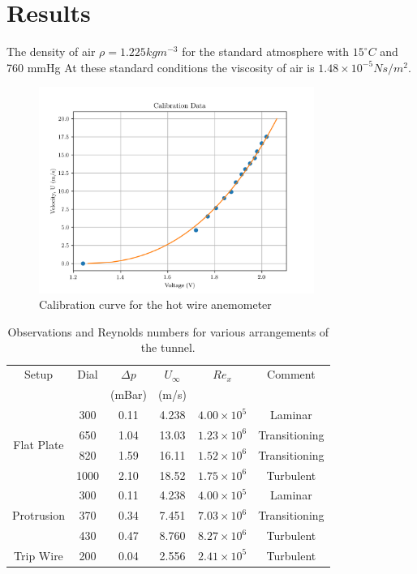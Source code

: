 \documentclass{article}
\begin{document}
\section{Results}

The density of air $\rho = 1.225kgm^{-3}$ for the standard atmosphere with $15^\circ C$ and 760 mmHg
At these standard conditions the viscosity of air is $1.48 \times 10^{-5} Ns/m^2$.

\begin{figure}[H]
    \centering
    \includegraphics[width=0.8\textwidth]{calibration.png}
    \caption{Calibration curve for the hot wire anemometer}
    \label{fig:calibration}
\end{figure}

\begin{table}[h]
    \centering
    \begin{tabular}{cccccc}
        \hline
        Setup & Dial & $\Delta p$ & $U_{\infty}$ & $Re_x$ & Comment \\
        & & (mBar) & (m/s) & & \\
        \hline
        \hline
        \multirow{4}{*}{Flat Plate} & 300 & 0.11 & 4.238 & $4.00 \times 10^5$ & Laminar \\
        & 650 & 1.04 &  13.03 & $1.23 \times 10^6$ & Transitioning \\
        & 820 & 1.59 & 16.11 & $1.52 \times 10^6$ & Transitioning \\
        & 1000 & 2.10 & 18.52 & $1.75 \times 10^6$ & Turbulent \\
        \hline
        \hline
        \multirow{3}{*}{Protrusion} & 300 & 0.11 & 4.238 & $4.00 \times 10^5$ & Laminar \\
        & 370 & 0.34 & 7.451  & $7.03 \times 10^6$ & Transitioning \\
        & 430 & 0.47 & 8.760  & $8.27 \times 10^6$ & Turbulent \\
        \hline
        \hline
        \multirow{1}{*}{Trip Wire} & 200 & 0.04 & 2.556 & $2.41 \times 10^5$ & Turbulent \\
        \hline
    \end{tabular}
    \caption{Observations and Reynolds numbers for various arrangements of the tunnel.}
    \label{tab:observations}
\end{table}
\end{document}
